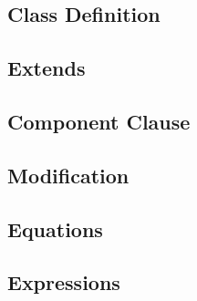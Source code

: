 \subsection{Class Definition}


\subsection{Extends}


\subsection{Component Clause}


\subsection{Modification}


\subsection{Equations}


\subsection{Expressions}



